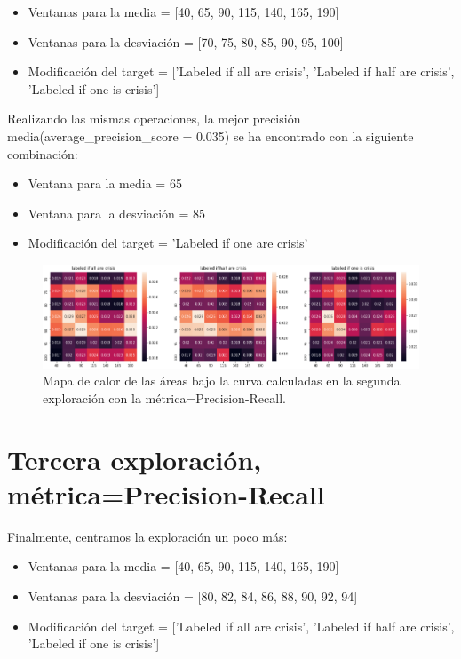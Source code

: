 \documentclass[a4paper,12pt,twoside,oldfontcommands]{memoir}
\begin{document}
\begin{itemize}
    \item Ventanas para la media = [40, 65, 90, 115, 140, 165, 190]
    \item Ventanas para la desviación = [70, 75, 80, 85, 90, 95, 100]
    \item Modificación del target = ['Labeled if all are crisis', 'Labeled if half are crisis', 'Labeled if one is crisis']
\end{itemize}

Realizando las mismas operaciones, la mejor precisión media(average\_precision\_score = 0.035) se ha encontrado con la siguiente combinación: 
\begin{itemize}
    \item Ventana para la media = 65
    \item Ventana para la desviación = 85
    \item Modificación del target = 'Labeled if one are crisis'
\end{itemize}

\begin{figure}
    \centering
    \includegraphics[width=1\textwidth]{images/heatmap5.png}
    \caption{Mapa de calor de las áreas bajo la curva calculadas en la segunda exploración con la métrica=Precision-Recall.}
    \label{fig:heatmap5}
\end{figure}

\section{Tercera exploración, métrica=Precision-Recall}
Finalmente, centramos la exploración un poco más: 
\begin{itemize}
    \item Ventanas para la media = [40, 65, 90, 115, 140, 165, 190]
    \item Ventanas para la desviación = [80, 82, 84, 86, 88, 90, 92, 94]
    \item Modificación del target = ['Labeled if all are crisis', 'Labeled if half are crisis', 'Labeled if one is crisis']
\end{itemize}
\end{document}
